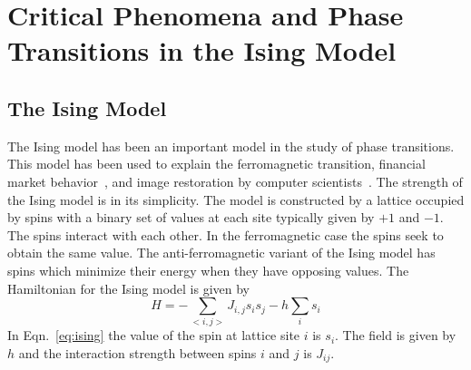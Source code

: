 
\chapter{\label{chp:nuc_details}Critical Phenomena and Phase Transitions in the Ising Model}

\section{The Ising Model}
The Ising model has been an important model in the study of phase transitions. This model has been used to explain the ferromagnetic transition, financial market  behavior~\cite{geraskin}, and image restoration by computer scientists~\cite{cohen13}. The strength of the Ising model is in its simplicity. The model is constructed by a lattice occupied by spins with a binary set of values at each site typically given by $+1$ and $-1$. The spins interact with each other. In the ferromagnetic case the spins seek to obtain the same value. The anti-ferromagnetic variant of the Ising model has spins which minimize their energy when they have opposing values. The Hamiltonian for the Ising model is given by%
\begin{equation}
 \label{eq:ising}
	H = -\sum_{{{<}}i,j{{{>}}}} J_{i,j} s_i s_j - h \sum_i s_i
\end{equation}%
In Eqn.~\eqref{eq:ising} the value of the spin at lattice site $i$ is $s_i$. The field is given by $h$ and the interaction strength between spins $i$ and $j$ is $J_{ij}$.
  
